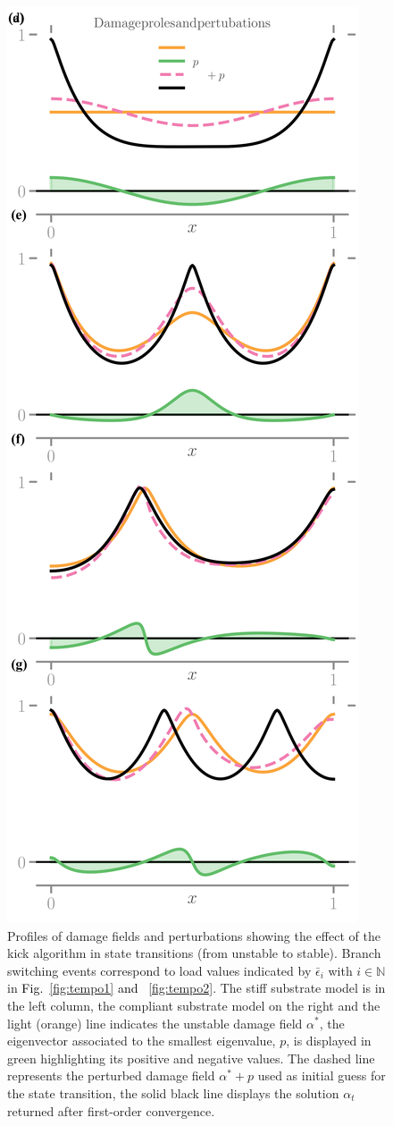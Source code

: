 \begin{figure}[htbp]
    \includegraphics*[align=c,width=.45\textwidth]{../images/model_compliant_kick_profiles.png}
    \caption{
        Profiles of damage fields and perturbations showing the effect of the kick algorithm in state transitions (from unstable to stable). Branch switching events correspond to load values indicated by $\bar \epsilon_i$ with $i\in \mathbb N$ in \textcolor{black}{Fig.~\ref{fig:tempo1} and ~\ref{fig:tempo2}}. The stiff substrate model is in the left column, the compliant substrate model on the right and  the light (orange) line indicates the unstable damage field $\alpha^*$, the eigenvector associated to the smallest eigenvalue, $p$, is displayed in green highlighting its positive and negative values. The dashed line represents the perturbed damage field  $\alpha^*+p$ used as initial guess for the state transition, the solid black line displays the solution $\alpha_t$ returned after first-order convergence.}
    \label{fig:kick}
\end{figure}



    
